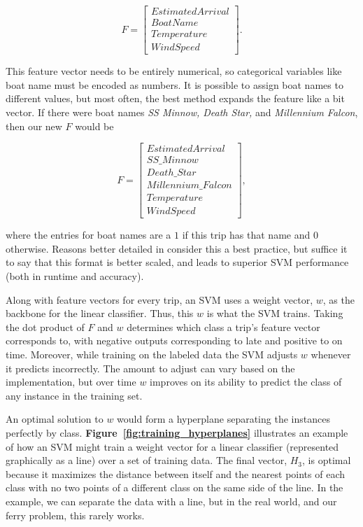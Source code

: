 \documentclass[11pt]{article} %
\begin{document}
\[F=\begin{bmatrix}
        EstimatedArrival \\
        BoatName\\
        Temperature\\
        WindSpeed
\end{bmatrix}.\]

This feature vector needs to be entirely numerical, so categorical variables like
boat name must be encoded as numbers.  It is possible to assign boat names to
different values, but most often, the best method expands the feature like a bit
vector.  If there were boat names \textit{SS Minnow, Death Star,} and 
\textit{Millennium Falcon}, then our new $F$ would be

\[F=\begin{bmatrix}
        EstimatedArrival \\
        SS\_Minnow\\
        Death\_Star\\
        Millennium\_Falcon\\
        Temperature\\
        WindSpeed
\end{bmatrix},\]

where the entries for boat names are a $1$ if this trip has that name and $0$
otherwise. Reasons better detailed in \cite{chang2011libsvm} consider this a  
best practice, but suffice it to say that this format is better scaled, and 
leads to superior SVM performance (both in runtime and accuracy).

Along with feature vectors for every trip, an SVM uses a weight vector, $w$,
as the backbone for the linear classifier. Thus, this $w$ is what the
SVM trains. Taking the dot product of $F$ and $w$ determines which class a 
trip's feature vector corresponds to, with negative outputs corresponding to 
late and positive to on time. Moreover, while training on the labeled data
the SVM adjusts $w$ whenever it predicts incorrectly.  The amount to adjust
can vary based on the implementation, but over time $w$ improves on its ability
to predict the class of any instance in the training set.

An optimal solution to $w$ would form a hyperplane separating the instances
perfectly by class. \textbf{Figure~\ref{fig:training_hyperplanes}} illustrates an
example of how an SVM might train a weight vector for a linear classifier 
(represented graphically as
a line) over a set of training data. The final vector, $H_3$, is  
optimal because it maximizes the distance between itself and the nearest points
of each class with no two points of a different class on the same side of the 
line. In the example, we can separate the data with a 
line, but in the real world, and our ferry problem, this rarely works.
\end{document}

